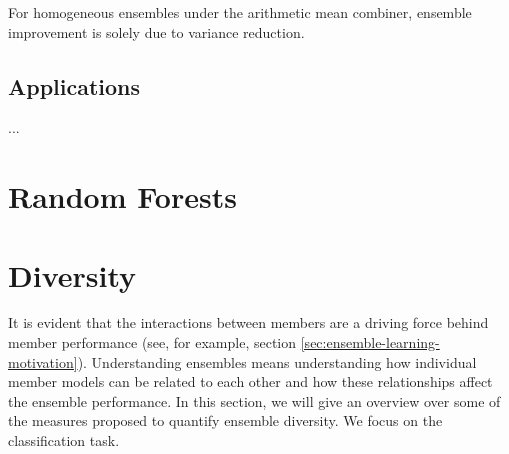 \documentclass[
    a4paper, %
	fontsize=10pt, %
	twoside=false, %
]{kaobook}
\begin{document}
\begin{titlepage}
\begin{corollary}
For homogeneous ensembles under the arithmetic mean combiner, ensemble improvement is solely due to variance reduction.
\end{corollary}


\section{Applications}
...


\chapter{Random Forests}


\chapter{Diversity}







It is evident that the interactions between members are a driving force behind member performance (see, for example, section \ref{sec:ensemble-learning-motivation}). Understanding ensembles means understanding how individual member models can be related to each other and how these relationships affect the ensemble performance. In this section, we will give an overview over some of the measures proposed to quantify ensemble diversity. We focus on the classification task. 


\end{titlepage}
\end{document}
